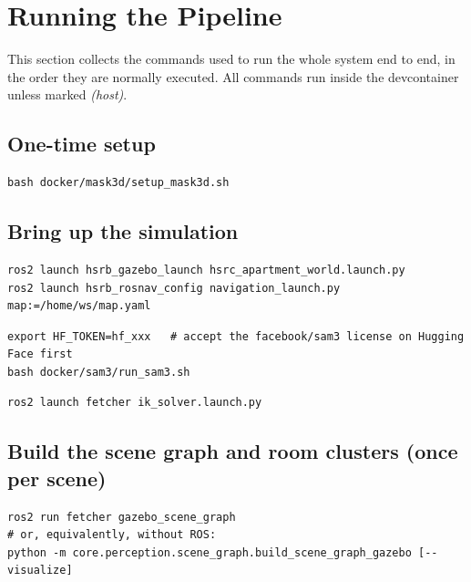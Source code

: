 \documentclass[11pt]{article}
\begin{document}
\section{Running the Pipeline}
\label{sec:run}

This section collects the commands used to run the whole system end to end,
in the order they are normally executed. All commands run inside the
devcontainer unless marked \emph{(host)}.

\subsection{One-time setup}

\begin{lstlisting}[style=sh,caption={Mask3D setup (host, only needed for requirement~9)}]
bash docker/mask3d/setup_mask3d.sh
\end{lstlisting}

\subsection{Bring up the simulation}

\begin{lstlisting}[style=sh,caption={Gazebo + Nav2 (Section~\ref{sec:architecture})}]
ros2 launch hsrb_gazebo_launch hsrc_apartment_world.launch.py
ros2 launch hsrb_rosnav_config navigation_launch.py map:=/home/ws/map.yaml
\end{lstlisting}

\begin{lstlisting}[style=sh,caption={SAM3 detection server (host, requirement~5)}]
export HF_TOKEN=hf_xxx   # accept the facebook/sam3 license on Hugging Face first
bash docker/sam3/run_sam3.sh
\end{lstlisting}

\begin{lstlisting}[style=sh,caption={IK solver (requirement~6)}]
ros2 launch fetcher ik_solver.launch.py
\end{lstlisting}

\subsection{Build the scene graph and room clusters (once per scene)}

\begin{lstlisting}[style=sh,caption={Requirement~1: scene graph from Gazebo ground truth (Section~\ref{sec:scenegraph})}]
ros2 run fetcher gazebo_scene_graph
# or, equivalently, without ROS:
python -m core.perception.scene_graph.build_scene_graph_gazebo [--visualize]
\end{lstlisting}
\end{document}

